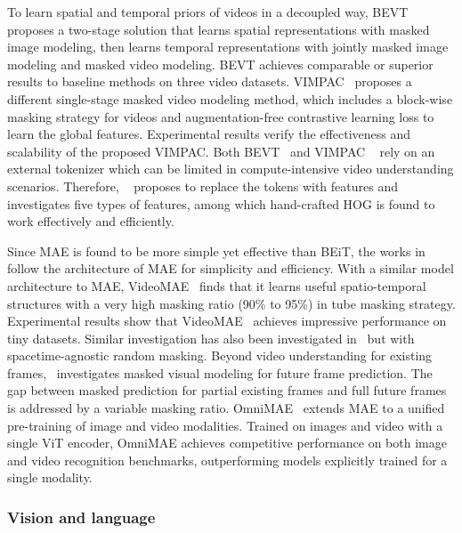 \documentclass[10pt,journal,compsoc]{IEEEtran}
\begin{document}
To learn spatial and temporal priors of videos in a decoupled way, BEVT ~\cite{wang2022bevt} proposes a two-stage solution that learns spatial representations with masked image modeling, then learns temporal representations with jointly masked 
image modeling and masked video modeling. BEVT achieves comparable or superior results to baseline methods on three video datasets. VIMPAC~\cite{tan2021vimpac} proposes a different single-stage masked video modeling method, which includes a block-wise masking strategy for videos and augmentation-free contrastive learning loss to learn the global features. Experimental results verify the effectiveness and scalability of the proposed VIMPAC. Both BEVT~\cite{wang2022bevt} and VIMPAC ~\cite{tan2021vimpac} rely on an external tokenizer which can be limited in compute-intensive video understanding scenarios. Therefore, ~\cite{wei2022masked} proposes to replace the tokens with features and investigates five types of features, among which hand-crafted HOG is found to work effectively and efficiently. 

Since MAE is found to be more simple yet effective than BEiT, the works in ~\cite{tong2022videomae,girdhar2022omnimae} follow the architecture of MAE for simplicity and efficiency. With a similar model architecture to MAE, VideoMAE~\cite{tong2022videomae} finds that 
it learns useful spatio-temporal structures with a very high masking ratio (90\% to 95\%) in tube masking strategy. Experimental results show that  VideoMAE~\cite{tong2022videomae} achieves impressive performance on tiny datasets. Similar investigation has also been investigated in~\cite{feichtenhofer2022masked} but with spacetime-agnostic random masking. Beyond video understanding for existing frames,~\cite{gupta2022maskvit} investigates masked visual modeling for future frame prediction. The gap between masked prediction for partial existing frames and full future frames is addressed by a variable masking ratio. OmniMAE~\cite{girdhar2022omnimae} extends MAE to a unified pre-training of image and video modalities. Trained on images and video with a single ViT encoder, OmniMAE achieves competitive performance on both image and video recognition benchmarks, outperforming models explicitly trained for a single modality.





\subsubsection{Vision and language}
\end{document}
